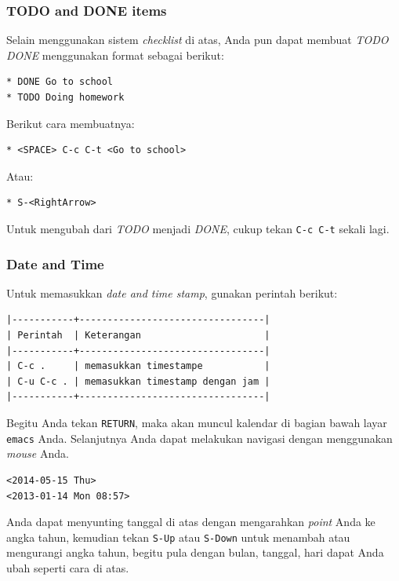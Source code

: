 \documentclass{article}
\begin{document}
\subsubsection{TODO and DONE items}
Selain menggunakan sistem \emph{checklist} di atas, Anda pun dapat membuat
\emph{TODO DONE} menggunakan format sebagai berikut:

\begin{verbatim}
* DONE Go to school
* TODO Doing homework
\end{verbatim}

Berikut cara membuatnya:

\begin{verbatim}
* <SPACE> C-c C-t <Go to school>
\end{verbatim}

Atau:

\begin{verbatim}
* S-<RightArrow>
\end{verbatim}

Untuk mengubah dari \emph{TODO} menjadi \emph{DONE}, cukup tekan
\verb=C-c C-t= sekali lagi.

\subsubsection{Date and Time}
Untuk memasukkan \emph{date and time stamp}, gunakan perintah berikut:

\begin{verbatim}
|-----------+---------------------------------|
| Perintah  | Keterangan                      |
|-----------+---------------------------------|
| C-c .     | memasukkan timestampe           |
| C-u C-c . | memasukkan timestamp dengan jam |
|-----------+---------------------------------|
\end{verbatim}

Begitu Anda tekan \verb=RETURN=, maka akan muncul kalendar di bagian bawah
layar \verb=emacs= Anda. Selanjutnya Anda dapat melakukan navigasi dengan
menggunakan \emph{mouse} Anda.

\begin{verbatim}
<2014-05-15 Thu>
<2013-01-14 Mon 08:57>
\end{verbatim}

Anda dapat menyunting tanggal di atas dengan mengarahkan \emph{point} Anda
ke angka tahun, kemudian tekan \verb=S-Up= atau \verb=S-Down= untuk 
menambah atau mengurangi angka tahun, begitu pula dengan bulan, tanggal, hari
dapat Anda ubah seperti cara di atas.
\end{document}
